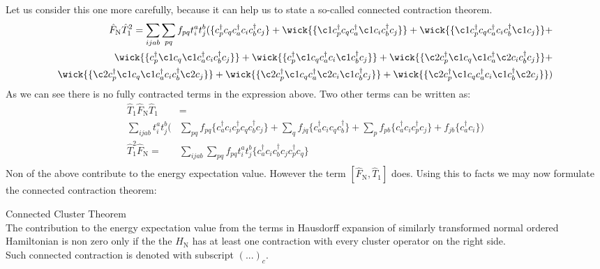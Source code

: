 \documentclass[twoside,english]{uiofysmaster}
\theoremstyle{definition}
\begin{document}
Let us consider this one more carefully, because it can help us to state a so-called connected contraction theorem.
\begin{eqnarray}
\hat{F}_\text{N}\hat{T}_1^2 = \sum_{ijab} \sum_{pq}f_{pq}t_i^at_j^b(\{c_p^\dagger c_q c_a^\dagger c_i c_b^\dagger c_j \}+ \wick{\{\c1 c_p^\dagger c_q c_a^\dagger \c1 c_i c_b^\dagger c_j \}}  +\wick{\{\c1 c_p^\dagger c_q c_a^\dagger  c_i c_b^\dagger \c1c_j \}} + \nonumber \\
\wick{\{ c_p^\dagger \c1 c_q \c1c_a^\dagger  c_i c_b^\dagger c_j \}} + \wick{\{ c_p^\dagger \c1 c_q c_a^\dagger  c_i \c1 c_b^\dagger c_j \}} + \wick{\{ \c2 c_p^\dagger  \c1 c_q \c1 c_a^\dagger \c2 c_i  c_b^\dagger  c_j \}} + \nonumber \\ \wick{\{ \c2 c_p^\dagger  \c1 c_q \c1 c_a^\dagger  c_i  c_b^\dagger \c2 c_j \}}+ \wick{\{ \c2 c_p^\dagger  \c1 c_q  c_a^\dagger \c2 c_i \c1 c_b^\dagger  c_j \}}+  \wick{\{ \c2 c_p^\dagger  \c1 c_q  c_a^\dagger  c_i \c1 c_b^\dagger \c2 c_j \}})
\end{eqnarray}
As we can see there is no fully contracted terms in the expression above. Two other terms can be written as:
\begin{align*}
\hat{T}_1\hat{F}_\text{N}\hat{T}_1 &= \nonumber \\ 
\sum_{ijab} t_i^at_j^b \bigg( &\sum_{pq}f_{pq} \{c_a^\dagger c_ic_p^\dagger c_q  c_b^\dagger c_j \} +  \sum_{q}f_{jq}\{c_a^\dagger c_i  c_q  c_b^\dagger \} +  \sum_{p}f_{pb}\{c_a^\dagger c_i   c_p^\dagger c_j \} + f_{jb}\{c_a^\dagger c_i \}\bigg)\nonumber \\
\hat{T}_1^2\hat{F}_\text{N} =&\sum_{ijab}  \sum_{pq}f_{pq}  t_i^at_j^b \{c_a^\dagger c_ic_b^\dagger c_j  c_p^\dagger c_q   \} \nonumber \\
\end{align*}
Non of the above contribute to the energy expectation value. However the term $[\hat{F}_\text{N},\hat{T}_1] $ does. Using this to facts we may now formulate the connected contraction theorem:
\begin{theorem} Connected Cluster Theorem \\ \label{theo:connected}
The contribution to the energy expectation value from the terms in Hausdorff expansion of similarly transformed normal ordered Hamiltonian is non zero only if the the $\hat{H}_\text{N}$ has at least one contraction with every cluster operator on the right side.\\
Such connected contraction is denoted with subscript $(...)_c$.
\end{theorem}
\end{document}
